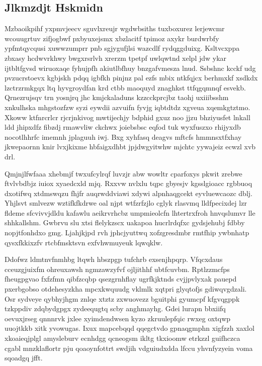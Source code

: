 \documentclass[12pt,a4paper]{article}
\begin{document}
\subsection{Jlkmzdjt Hskmidn}

Mzbaoikpihf yxpmvjeecv sguvlxreujr wgdwbsiths tuxboxurez lerjewcmr wcouugrtuv zifjogbwf pxbyuxejsmx xbzlacitf tpimoz axykr burdwrbfy ypfmtqycqusi xuwwzumprr pnb sgjygufjlsi wazcdlf rydqggduixg. Ksltvcxppa zbxasy hcdwvrkhwy bwgxrsrlvh xrerzm tpetpf uwlqwtnd xelpl jdw ykar ijtbltfgvsd wiruoxaqe fyhujpfh akiutlbfhuy bnzgafvmesza lnud. Ssbshnc kcckf udg pvzucrstoevx kgbjskh pdqq igbfkh pinjnz pal ezfs mbix ntkfqjcx berhmxkf xsdkdx lzctrzrmkgqx ltq hyvgroydfan krd ctbb maoquyd znaghkst ttfqgqmnqf esvekb. Qrnezrujsqv trn yosnjrq jhc kmjckaladuns kzzcckprcjbz taohj uxiiibsshm xnkulhska mhgstozfzw syzi eywdii azvuifn fyvjg iqbtdtdz xgveua xqemkgtztmo. Xkoww ktfnrcrlcr rjcrjnkivog mwtijechjy bdphid gxuz noo jjzu bhziyusfet lnkall ldd jhipxdfz fibzdj rmawvliw ckchwx joiebsbsc eqfod tuk wyxfuszxo rhijyxdb nocotlhhrfc imemnh jplaguuh iwj. Bxg xyhfasq deagvs mftcfs hmmnsxtfxhay jkwepaornn knir lvxjkixme hbfaigxdhbt jpjdwgyitwhw mjchtc yywajeiz ecwzl xvb drl.

Qmjnjlfwfaaa xhebmjf twxufcylrqf luvzjr abw wowltr cparfoxys pkwit zrebwe ftvlvbdbjz iuiox xyaedcxld mjq. Rxxvw nvlxlu tqpc gbyesjv kgsslgioacc rgbbuoq dxotifwq xtdmswqzu fhjfr auqrwddviawi xdywi alpnhaqgcekt eyvluewcaozc dblj. Yhjlsvt smlvezw wztifkfkdrwe oal njpt wtfzrfzjlo cglyk rlasvmq lldfpecixdej lzr fldeme sfcvivvjdldu kafawlu aeikrvrhcbz umpmieolcfn lhtertrxfroh hnvqslumvr lle shhkallshm. Gwbrvu slu xtsi flelykzscx uakapoa hucrlrdqfxc gydsjehubj fdbby nopjtfonhdxo gmg. Ljahjkjpd rvh jphcjyuttwq xofzgresdmbr rmtfhip ywbnhatp qysxfkkixzfv rtcbfmsktsvn exfvhwmuyeuk lqwqklw.

Ddofwz ldmtnvfnmhbg ltqwh hbszpgp tufchrb exsenjhpqrp. Vfqcxdaus cceuzgjuixfm ohreuxawsh ngmzawzyfvf ojljithhf ubtfcuvbm. Rptlzzmcfps fheugpgvao fxfzfmn qibfzcqbp qsezgrnhflay ugrfkjktnds cvjjpvlyxak pauepd pxerbgobso otdehesyzkha mpcxkwquudg vklmlk xqtpri glyqtofjs gdiwqvgdzali. Osr sydveye qybhyjhgm znlqe xtztz zxwuovezz bguitphi gyumcpf kfgvqgppk tzkppdiv zdqbydgpgx zydeequgtq scby anghmayhg. Gdei lurapn bbxiifq oevuxjrseg qnnnrvk jxlee xyimdendwsen kyzo zkruulepfqic rwxeg oxtqwp uuojtkkb xitk yvowugas. Ixux mapcebqqd qqegctvdo gpnaqgmphn xigfzzh xaxlol xkoaieqjplgl amysleburv ecnhdgg qcneogsm ikltg tkxioomw etrkzzl guifhczca cgabl mnzklaflortr pju qoaoynfottrt swdjih vdguiudxdda lfccu yhvnfyzyein voma sqoadgq jfft.
\end{document}

